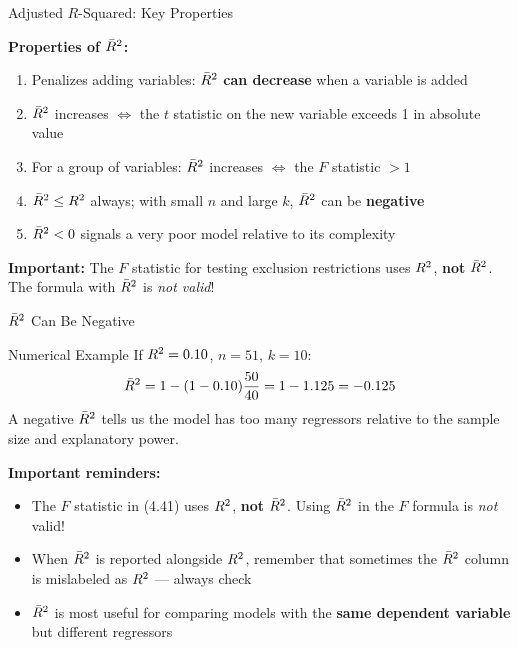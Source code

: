 \documentclass[aspectratio=169, 12pt]{beamer}
\begin{document}
\begin{frame}[shrink=8]{Adjusted $R$-Squared: Key Properties}

  \begin{keybox}
    \textbf{Properties of $\bar{R}^2$:}
    \begin{enumerate}
      \item Penalizes adding variables: $\bar{R}^2$ \textbf{can decrease} when a variable is added
      \item $\bar{R}^2$ increases $\iff$ the $t$ statistic on the new variable exceeds 1 in absolute value
      \item For a group of variables: $\bar{R}^2$ increases $\iff$ the $F$ statistic $> 1$
      \item $\bar{R}^2 \leq R^2$ always; with small $n$ and large $k$, $\bar{R}^2$ can be \textbf{negative}
      \item $\bar{R}^2 < 0$ signals a very poor model relative to its complexity
    \end{enumerate}
  \end{keybox}

  \medskip

  \begin{highlightbox}
    \textbf{Important:} The $F$ statistic for testing exclusion restrictions uses $R^2$, \textbf{not} $\bar{R}^2$.
    The formula with $\bar{R}^2$ is \emph{not valid}!
  \end{highlightbox}

\end{frame}

\begin{frame}[shrink=8]{$\bar{R}^2$ Can Be Negative}

      \begin{examplebox}{Numerical Example}
        If $R^2 = 0.10$, $n = 51$, $k = 10$:
        \[
          \bar{R}^2 = 1 - (1 - 0.10) \frac{50}{40} = 1 - 1.125 = -0.125
        \]
        A negative $\bar{R}^2$ tells us the model has too many
        regressors relative to the sample size and explanatory power.
      \end{examplebox}
  \medskip

      \begin{highlightbox}
        \textbf{Important reminders:}
        \begin{itemize}
          \item The $F$ statistic in (4.41) uses $R^2$, \textbf{not} $\bar{R}^2$.
                Using $\bar{R}^2$ in the $F$ formula is \emph{not} valid!
          \item When $\bar{R}^2$ is reported alongside $R^2$, remember that sometimes
                the $\bar{R}^2$ column is mislabeled as $R^2$ --- always check
          \item $\bar{R}^2$ is most useful for comparing models with the
                \textbf{same dependent variable} but different regressors
        \end{itemize}
      \end{highlightbox}

\end{frame}
\end{document}
